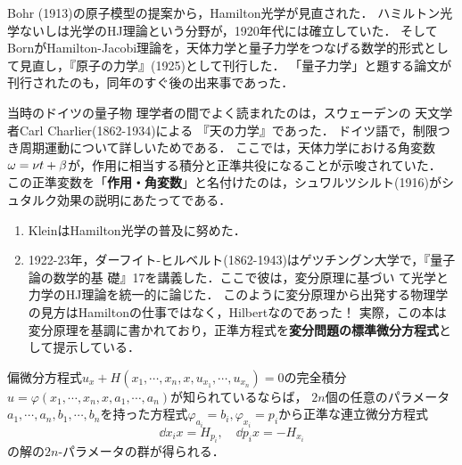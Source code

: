\documentclass[uplatex, dvipdfmx]{jsreport}
\begin{document}
\begin{tcolorbox}[colframe=ForestGreen, colback=ForestGreen!10!white,breakable,colbacktitle=ForestGreen!40!white,coltitle=black,fonttitle=\bfseries\sffamily,
title=]
    Bohr (1913)の原子模型の提案から，Hamilton光学が見直された．
    ハミルトン光学ないしは光学のHJ理論という分野が，1920年代には確立していた．
    そしてBornがHamilton-Jacobi理論を，天体力学と量子力学をつなげる数学的形式として見直し，『原子の力学』(1925)として刊行した．
    「量子力学」と題する論文が刊行されたのも，同年のすぐ後の出来事であった．
\end{tcolorbox}

\begin{history}
    当時のドイツの量子物
理学者の間でよく読まれたのは，スウェーデンの
天文学者Carl Charlier(1862-1934)による
『天の力学』であった．
ドイツ語で，制限つき周期運動について詳しいためである．
ここでは，天体力学における角変数$\omega=\nu t+\beta$が，作用に相当する積分と正準共役になることが示唆されていた．
この正準変数を「\textbf{作用・角変数}」と名付けたのは，シュワルツシルト(1916)がシュタルク効果の説明にあたってである．
\end{history}

\begin{history}
    \begin{enumerate}
        \item KleinはHamilton光学の普及に努めた．
        \item 1922-23年，ダーフイト-ヒルベルト(1862-1943)はゲツチングン大学で，『量子論の数学的基
        礎』17を講義した．ここで彼は，変分原理に基づい
        て光学と力学のHJ理論を統一的に論じた．
        このように変分原理から出発する物理学の見方はHamiltonの仕事ではなく，Hilbertなのであった！
        実際，この本は変分原理を基調に書かれており，正準方程式を\textbf{変分問題の標準微分方程式}として提示している．
    \end{enumerate}
\end{history}

\begin{theorem}[Jacobi]
    偏微分方程式$u_x+H(x_1,\cdots,x_n,x,u_{x_1},\cdots,u_{x_n})=0$の完全積分$u=\varphi(x_1,\cdots,x_n,x,a_1,\cdots,a_n)$が知られているならば，
    $2n$個の任意のパラメータ$a_1,\cdots,a_n,b_1,\cdots,b_n$を持った方程式$\varphi_{a_i}=b_i,\varphi_{x_i}=p_i$から正準な連立微分方程式
    \[\dd{x_i}{x}=H_{p_i},\quad\dd{p_i}{x}=-H_{x_i}\]
    の解の$2n$-パラメータの群が得られる．
\end{theorem}
\end{document}
